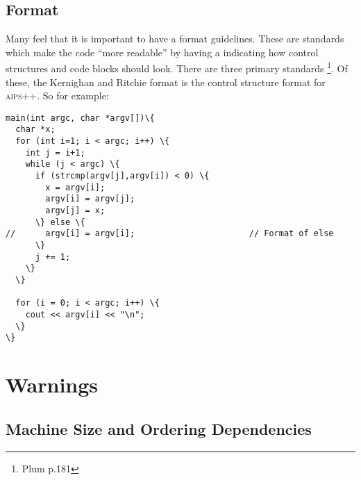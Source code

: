 \subsection{Format}
Many feel that it is important to have a format guidelines. These are
standards which make the code ``more readable'' by having a indicating
how control structures and code blocks should look. There are three
primary standards \footnote{Plum p.181}. Of these, the Kernighan and
Ritchie format is the control structure format for \textsc{aips++}.
So for example:
\begin{verbatim}
main(int argc, char *argv[])\{
  char *x;
  for (int i=1; i < argc; i++) \{
    int j = i+1;
    while (j < argc) \{
      if (strcmp(argv[j],argv[i]) < 0) \{
        x = argv[i];
        argv[i] = argv[j];
        argv[j] = x;
      \} else \{
//      argv[i] = argv[i];                       // Format of else
      \}
      j += 1;
    \}
  \}

  for (i = 0; i < argc; i++) \{
    cout << argv[i] << "\n";
  \}
\}
\end{verbatim}

\section{Warnings}

\subsection{Machine Size and Ordering Dependencies}
